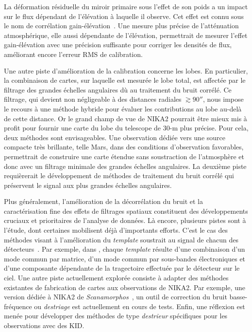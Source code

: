 La déformation résiduelle du miroir primaire sous l'effet de son poids
a un impact sur le flux dépendant de l'élévation à laquelle il
observe. Cet effet est connu sous le nom de corrélation
gain-élévation~\citep{Greve1998b}. Une mesure plus précise de
l'atténuation atmosphérique, elle aussi dépendante de l'élévation, 
permettrait de mesurer l'effet gain-élévation avec une précision
suffisante pour corriger les densités de flux, améliorant encore
l'erreur RMS de calibration.

Une autre piste d'amélioration de la calibration concerne les
lobes. En particulier, la combinaison de cartes, sur laquelle est
mesurée le lobe total, est affectée par le filtrage des grandes
échelles angulaires dù au traitement du bruit corrélé. Ce filtrage,
qui devient non négligeable à des distances radiales $\gtrsim 90''$,
nous impose le recours à une méthode hybride pour évaluer les
contributions au lobe au-delà de cette distance. Or le grand champ de
vue de NIKA2 pourrait être mieux mis à profit pour fournir une carte
du lobe du telescope de 30-m plus précise. Pour cela, deux méthodes sont
envisageables. Une observation dédiée vers une source compacte très
brillante, telle Mars, dans des conditions d'observation favorables,
permettrait de construire une carte étendue sans soustraction de
l'atmosphère et donc avec un filtrage minimale des grandes échelles
angulaires. La deuxième piste requièrerait le développement de
méthodes de traitement du bruit corrélé qui préservent le signal aux
plus grandes échelles angulaires.


Plus généralement, l'amélioration de la décorrélation du bruit et la
caractérisation fine des effets de filtrages spatiaux constituent des
développements cruciaux et prioritaires de l'analyse de données. Là
encore, plusieurs pistes sont à l'étude, dont certaines mobilisent
déjà d'importants efforts. C'est le cas des méthodes visant à
l'amélioration du \emph{template} soustrait au signal de chacun des
détecteurs~\citep{Ponthieu2020}. Par exemple, dans \citet{Ruppin2019},
chaque \emph{template} résulte d'une combinaison d'un mode commun par
matrice, d'un mode commun par sous-bandes électroniques et d'une
composante dépendante de la tragectoire effectuée par le détecteur sur
le ciel. Une autre piste actuellement explorée consiste à adapter des
méthodes existantes de fabrication de cartes aux observations de
NIKA2. Par exemple, une version dédiée à NIKA2 de
\emph{Scanamorphos}~\citep{Roussel2013, Roussel2018}, un outil de
correction du bruit basse-fréquence ou \emph{destriage} est
actuellement en cours de tests. Enfin, une réflexion est menée pour
développer des méthodes de type \emph{destrieur} spécifiques pour les
observations avec des KID.

